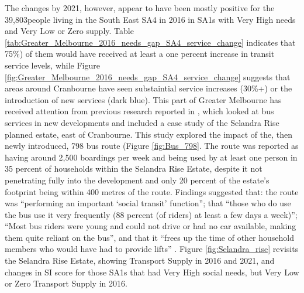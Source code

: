 \documentclass[preprint, 3p,
authoryear]{elsarticle} %
\begin{document}
The changes by 2021, however, appear to have been mostly positive for
the 39,803people living in the South East SA4 in 2016 in SA1s with Very
High needs and Very Low or Zero supply. Table
\ref{tab:Greater_Melbourne_2016_needs_gap_SA4_service_change} indicates
that 75\%) of them would have received at least a one percent increase
in transit service levels, while Figure
\ref{fig:Greater_Melbourne_2016_needs_gap_SA4_service_change} suggests
that areas around Cranbourne have seen substaintial service increases
(30\%+) or the introduction of new services (dark blue). This part of
Greater Melbourne has received attention from previous research reported
in \citet{delbosc2015impact}, which looked at bus services in new
developments and included a case study of the Selandra Rise planned
estate, east of Cranbourne. This study explored the impact of the, then
newly introduced, 798 bus route (Figure \ref{fig:Bus_798}. The route was
reported as having around 2,500 boardings per week and being used by at
least one person in 35 percent of households within the Selandra Rise
Estate, despite it not penetrating fully into the development and only
20 percent of the estate's footprint being within 400 metres of the
route. Findings suggested that: the route was ``performing an important
`social transit' function''; that ``those who do use the bus use it very
frequently (88 percent (of riders) at least a few days a week)''; ``Most
bus riders were young and could not drive or had no car available,
making them quite reliant on the bus'', and that it ``frees up the time
of other household members who would have had to provide lifts''
\citep[p.10]{delbosc2015impact}. Figure \ref{fig:Selandra_rise} revisits
the Selandra Rise Estate, showing Transport Supply in 2016 and 2021, and
changes in SI score for those SA1s that had Very High social needs, but
Very Low or Zero Transport Supply in 2016.
\end{document}
